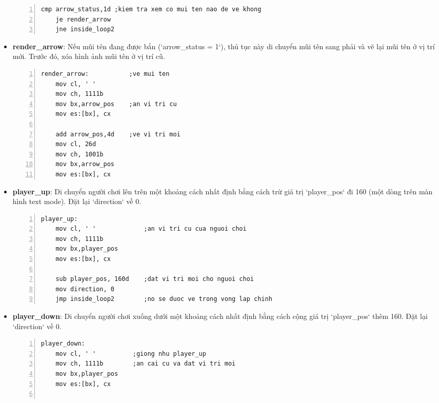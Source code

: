 \documentclass[12pt,a4paper,openany,oneside]{report}
\begin{document}
\begin{itemize}
\begin{lstlisting}[caption={Mã nguồn nhãn render_loon}, basicstyle=\ttfamily\footnotesize, numbers=left, numberstyle=\tiny, stepnumber=1, numbersep=5pt, breaklines=true, language={[x86masm]Assembler}]
    cmp arrow_status,1d ;kiem tra xem co mui ten nao de ve khong
    je render_arrow
    jne inside_loop2 
\end{lstlisting} 
    \item \textbf{render\_arrow}: Nếu mũi tên đang được bắn (`arrow_status = 1`), thủ tục này di chuyển mũi tên sang phải và vẽ lại mũi tên ở vị trí mới. Trước đó, xóa hình ảnh mũi tên ở vị trí cũ.
\begin{lstlisting}[caption={Mã nguồn nhãn render_arrow}, basicstyle=\ttfamily\footnotesize, numbers=left, numberstyle=\tiny, stepnumber=1, numbersep=5pt, breaklines=true, language={[x86masm]Assembler}]
render_arrow:           ;ve mui ten
    mov cl, ' '
    mov ch, 1111b
    mov bx,arrow_pos    ;an vi tri cu
    mov es:[bx], cx
                
    add arrow_pos,4d    ;ve vi tri moi
    mov cl, 26d
    mov ch, 1001b
    mov bx,arrow_pos 
    mov es:[bx], cx
\end{lstlisting} 
    \item \textbf{player\_up}: Di chuyển người chơi lên trên một khoảng cách nhất định bằng cách trừ giá trị `player_pos` đi 160 (một dòng trên màn hình text mode). Đặt lại `direction` về 0.
\begin{lstlisting}[caption={Mã nguồn nhãn player_up}, basicstyle=\ttfamily\footnotesize, numbers=left, numberstyle=\tiny, stepnumber=1, numbersep=5pt, breaklines=true, language={[x86masm]Assembler}]
player_up:                 
    mov cl, ' '             ;an vi tri cu cua nguoi choi
    mov ch, 1111b
    mov bx,player_pos 
    mov es:[bx], cx
    
    sub player_pos, 160d    ;dat vi tri moi cho nguoi choi
    mov direction, 0    
    jmp inside_loop2        ;no se duoc ve trong vong lap chinh
\end{lstlisting} 
    \item \textbf{player\_down}: Di chuyển người chơi xuống dưới một khoảng cách nhất định bằng cách cộng giá trị `player_pos` thêm 160. Đặt lại `direction` về 0.
\begin{lstlisting}[caption={Mã nguồn nhãn player_down}, basicstyle=\ttfamily\footnotesize, numbers=left, numberstyle=\tiny, stepnumber=1, numbersep=5pt, breaklines=true, language={[x86masm]Assembler}]
player_down:
    mov cl, ' '          ;giong nhu player_up
    mov ch, 1111b        ;an cai cu va dat vi tri moi
    mov bx,player_pos 
    mov es:[bx], cx
    

\end{lstlisting}
\end{itemize}
\end{document}
